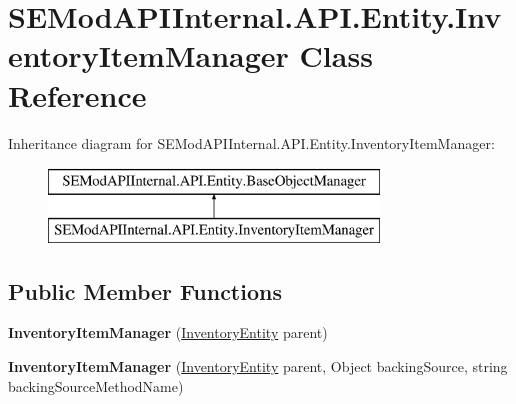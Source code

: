 \hypertarget{class_s_e_mod_a_p_i_internal_1_1_a_p_i_1_1_entity_1_1_inventory_item_manager}{}\section{S\+E\+Mod\+A\+P\+I\+Internal.\+A\+P\+I.\+Entity.\+Inventory\+Item\+Manager Class Reference}
\label{class_s_e_mod_a_p_i_internal_1_1_a_p_i_1_1_entity_1_1_inventory_item_manager}
Inheritance diagram for S\+E\+Mod\+A\+P\+I\+Internal.\+A\+P\+I.\+Entity.\+Inventory\+Item\+Manager\+:\begin{figure}[H]
\begin{center}
\leavevmode
\includegraphics[height=2.000000cm]{class_s_e_mod_a_p_i_internal_1_1_a_p_i_1_1_entity_1_1_inventory_item_manager}
\end{center}
\end{figure}
\subsection*{Public Member Functions}
\begin{DoxyCompactItemize}
\item 
\hypertarget{class_s_e_mod_a_p_i_internal_1_1_a_p_i_1_1_entity_1_1_inventory_item_manager_a83655fcc01093a9b84380c54cf3bea1c}{}{\bfseries Inventory\+Item\+Manager} (\hyperlink{class_s_e_mod_a_p_i_internal_1_1_a_p_i_1_1_entity_1_1_inventory_entity}{Inventory\+Entity} parent)\label{class_s_e_mod_a_p_i_internal_1_1_a_p_i_1_1_entity_1_1_inventory_item_manager_a83655fcc01093a9b84380c54cf3bea1c}

\item 
\hypertarget{class_s_e_mod_a_p_i_internal_1_1_a_p_i_1_1_entity_1_1_inventory_item_manager_ab9612fc49ebab355b23677099d5d8240}{}{\bfseries Inventory\+Item\+Manager} (\hyperlink{class_s_e_mod_a_p_i_internal_1_1_a_p_i_1_1_entity_1_1_inventory_entity}{Inventory\+Entity} parent, Object backing\+Source, string backing\+Source\+Method\+Name)\label{class_s_e_mod_a_p_i_internal_1_1_a_p_i_1_1_entity_1_1_inventory_item_manager_ab9612fc49ebab355b23677099d5d8240}

\end{DoxyCompactItemize}
